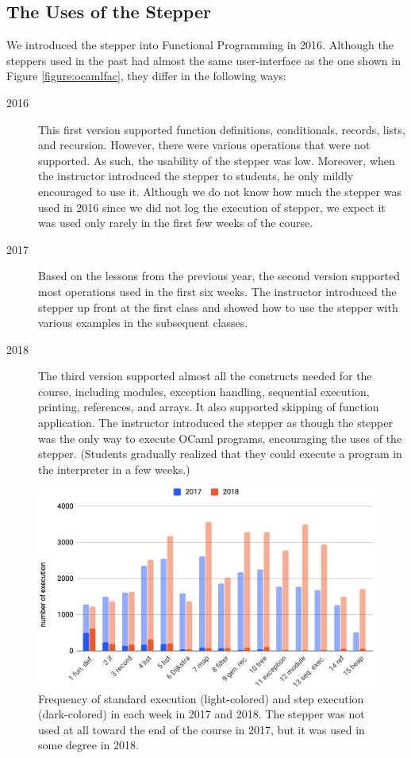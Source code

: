 \subsection{The Uses of the Stepper}
We introduced the stepper into Functional Programming in 2016.
Although the steppers used in the past had almost the same user-interface as the one shown in Figure \ref{figure:ocamlfac}, they differ in the following ways:
\begin{description}
\item[2016] This first version supported function definitions,
conditionals, records, lists, and recursion.  However, there were
various operations that were not supported.
As such, the usability of the stepper was low.
Moreover, when the instructor introduced the stepper to students, he
only mildly encouraged to use it.
Although we do not know how much the stepper was used in 2016 since we
did not log the execution of stepper, we expect it was used
only rarely in the first few weeks of the course.
\item[2017] Based on the lessons from the previous year, the second
version supported most operations used in the first six weeks.
The instructor introduced the stepper up front at the first class and
showed how to use the stepper with various examples in the subsequent
classes.
\item[2018] The third version supported almost all the constructs
needed for the course, including modules, exception handling,
sequential execution, printing, references, and arrays.
It also supported skipping of function application.
The instructor introduced the stepper as though the stepper was the
only way to execute OCaml programs, encouraging the uses of the
stepper.
(Students gradually realized that they could execute a program in the
interpreter in a few weeks.)
\end{description}

\begin{figure}
  \begin{center}
    \includegraphics[width=15cm]{6/table1a.eps}
    \caption{Frequency of standard execution (light-colored) and step execution (dark-colored) in each week in 2017 and 2018. The stepper was not used at all toward the end of the course in 2017, but it was used in some degree in 2018.}
    \label{figure:allExecution}
  \end{center}
\end{figure}

